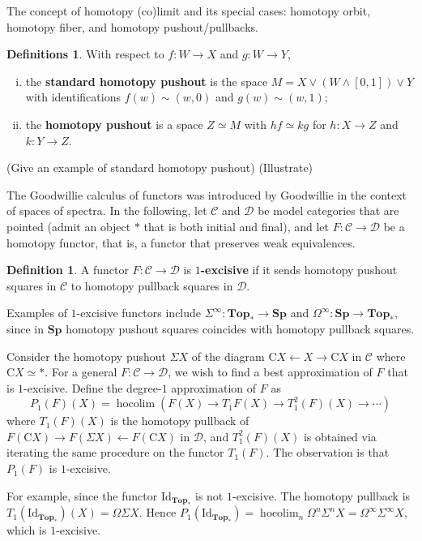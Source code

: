 \documentclass[psamsfonts]{amsart}
\theoremstyle{definition}
\newtheorem{defn}[thm]{Definition}
\newtheorem{defns}[thm]{Definitions}
\theoremstyle{remark}
\newcommand{\Sp}{\mathbf{Sp}}
\newcommand{\Id}{\mathrm{Id}}
\newcommand{\C}{\mathrm{C}}
\newcommand{\Top}{\mathbf{Top}}
\DeclareMathOperator{\hocolim}{hocolim}
\numberwithin{equation}{section}
\begin{document}
The concept of homotopy (co)limit and its special cases: homotopy orbit, homotopy fiber, and homotopy pushout/pullbacks.

\begin{defns}
With respect to $f:W\to X$ and $g:W\to Y$,\begin{enumerate}[(i)]
    \item the \textbf{standard homotopy pushout} is the space $M=X\vee(W\wedge[0,1])\vee Y$ with identifications $f(w)\sim(w,0)$ and $g(w)\sim(w,1)$;
    \item the \textbf{homotopy pushout} is a space $Z\simeq M$ with $hf\simeq kg$ for $h:X\to Z$ and $k:Y\to Z$.
\end{enumerate}
\end{defns}
(Give an example of standard homotopy pushout) (Illustrate)\medbreak

The Goodwillie calculus of functors was introduced by Goodwillie \cite{Goodwillie} in the context of spaces of spectra. In the following, let $\mathcal{C}$ and $\mathcal{D}$ be model categories that are pointed (admit an object $\ast$ that is both initial and final), and let $F:\mathcal{C}\to\mathcal{D}$ be a homotopy functor, that is, a functor that preserves weak equivalences.

\begin{defn}
A functor $F:\mathcal{C}\to\mathcal{D}$ is \textbf{$1$-excisive} if it sends homotopy pushout squares in $\mathcal{C}$ to homotopy pullback squares in $\mathcal{D}$.
\end{defn}

Examples of $1$-excisive functors include $\Sigma^\infty:\Top_\ast\to\Sp$ and $\Omega^\infty:\Sp\to\Top_\ast$, since in $\Sp$ homotopy pushout squares coincides with homotopy pullback squares.\medbreak

Consider the homotopy pushout $\Sigma X$ of the diagram $\C X\leftarrow X\rightarrow\C X$ in $\mathcal{C}$ where $\C X\simeq\ast$. For a general $F:\mathcal{C}\to\mathcal{D}$, we wish to find a best approximation of $F$ that is $1$-excisive. Define the degree-$1$ approximation of $F$ as
\[P_1(F)(X)=\hocolim(F(X)\to T_1F(X)\to T_1^2(F)(X)\to\cdots)\]
where $T_1(F)(X)$ is the homotopy pullback of $F(\C X)\rightarrow F(\Sigma X)\leftarrow F(\C X)$ in $\mathcal{D}$, and $T_1^2(F)(X)$ is obtained via iterating the same procedure on the functor $T_1(F)$. The observation is that $P_1(F)$ is $1$-excisive.\medbreak

For example, since the functor $\Id_{\Top_\ast}$ is not $1$-excisive. The homotopy pullback is $T_1(\Id_{\Top_\ast})(X)=\Omega\Sigma X$. Hence $P_1(\Id_{\Top_\ast})=\hocolim_n\Omega^n\Sigma^nX=\Omega^\infty\Sigma^\infty X$, which is $1$-excisive.
\end{document}
